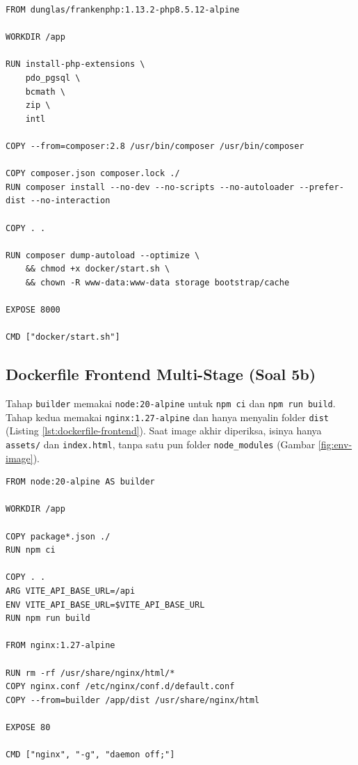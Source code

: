 \documentclass[a4paper,oneside,12pt]{report}
\begin{document}
\begin{lstlisting}[style=dockerstyle,caption={backend/Dockerfile.},label={lst:dockerfile-backend}]
FROM dunglas/frankenphp:1.13.2-php8.5.12-alpine

WORKDIR /app

RUN install-php-extensions \
    pdo_pgsql \
    bcmath \
    zip \
    intl

COPY --from=composer:2.8 /usr/bin/composer /usr/bin/composer

COPY composer.json composer.lock ./
RUN composer install --no-dev --no-scripts --no-autoloader --prefer-dist --no-interaction

COPY . .

RUN composer dump-autoload --optimize \
    && chmod +x docker/start.sh \
    && chown -R www-data:www-data storage bootstrap/cache

EXPOSE 8000

CMD ["docker/start.sh"]
\end{lstlisting}

\subsection{Dockerfile Frontend Multi-Stage (Soal 5b)}
Tahap \texttt{builder} memakai \texttt{node:20-alpine} untuk \texttt{npm ci} dan \texttt{npm run build}. Tahap kedua memakai \texttt{nginx:1.27-alpine} dan hanya menyalin folder \texttt{dist} (Listing \ref{lst:dockerfile-frontend}). Saat image akhir diperiksa, isinya hanya \texttt{assets/} dan \texttt{index.html}, tanpa satu pun folder \texttt{node\_modules} (Gambar \ref{fig:env-image}).

\begin{lstlisting}[style=dockerstyle,caption={frontend/Dockerfile.},label={lst:dockerfile-frontend}]
FROM node:20-alpine AS builder

WORKDIR /app

COPY package*.json ./
RUN npm ci

COPY . .
ARG VITE_API_BASE_URL=/api
ENV VITE_API_BASE_URL=$VITE_API_BASE_URL
RUN npm run build

FROM nginx:1.27-alpine

RUN rm -rf /usr/share/nginx/html/*
COPY nginx.conf /etc/nginx/conf.d/default.conf
COPY --from=builder /app/dist /usr/share/nginx/html

EXPOSE 80

CMD ["nginx", "-g", "daemon off;"]
\end{lstlisting}
\end{document}
